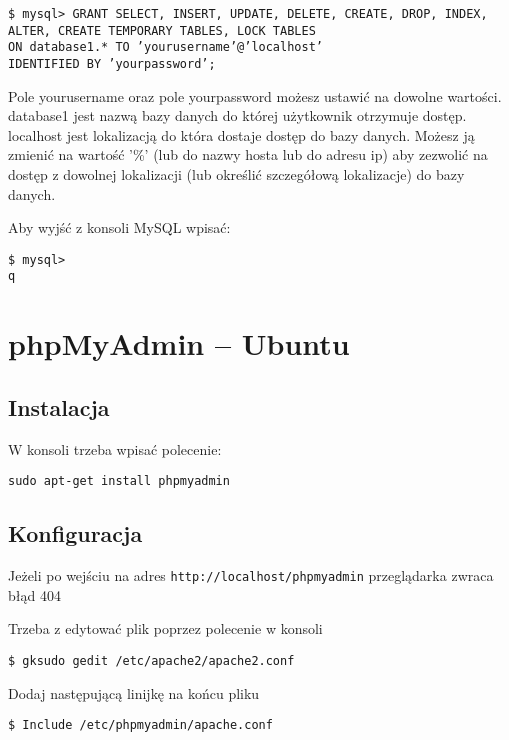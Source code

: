 \documentclass{article}
\begin{document}
\texttt{\$ mysql> GRANT SELECT, INSERT, UPDATE, DELETE, CREATE, DROP, INDEX, ALTER, CREATE TEMPORARY TABLES, LOCK TABLES\\ ON database1.* TO 'yourusername'@'localhost' \\IDENTIFIED BY 'yourpassword';}

Pole yourusername oraz pole yourpassword możesz ustawić na dowolne wartości. database1 jest nazwą bazy danych do której użytkownik otrzymuje dostęp. localhost jest lokalizacją do która dostaje dostęp do bazy danych. Możesz ją zmienić na wartość '\%' (lub do nazwy hosta lub do adresu ip) aby zezwolić na dostęp z dowolnej lokalizacji (lub określić szczegółową lokalizacje) do bazy danych. 

Aby wyjść z konsoli MySQL wpisać:

\texttt{\$ mysql> \\q}
\section{phpMyAdmin -- Ubuntu}
\subsection{Instalacja}
W konsoli trzeba wpisać polecenie:

\texttt{sudo apt-get install phpmyadmin}
\subsection{Konfiguracja}
Jeżeli po wejściu na adres \texttt{http://localhost/phpmyadmin} przeglądarka zwraca błąd 404

Trzeba z edytować plik poprzez polecenie w konsoli

\texttt{\$ gksudo gedit /etc/apache2/apache2.conf}

Dodaj następującą linijkę na końcu pliku

\texttt{\$ Include /etc/phpmyadmin/apache.conf}
\end{document}

